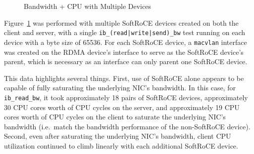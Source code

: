 \documentclass[12pt,titlepage]{article}
\begin{document}
\begin{figure}
	\centering
	\caption{Bandwidth + CPU with Multiple Devices}%
	\label{fig:softroce_multi_vdev}
\end{figure}

Figure~\ref{fig:softroce_multi_vdev} was performed with multiple SoftRoCE devices created on both the client and server, with a single \texttt{ib\_(read|write|send)\_bw} test running on each device with a byte size of 65536.
For each SoftRoCE device, a \texttt{macvlan} interface was created on the RDMA device's interface to serve as the SoftRoCE device's parent, which is necessary as an interface can only parent one SoftRoCE device.

This data highlights several things.
First, use of SoftRoCE alone appears to be capable of fully saturating the underlying NIC's bandwidth.
In this case, for \texttt{ib\_read\_bw}, it took approximately 18 pairs of SoftRoCE devices, approximately 30 CPU cores worth of CPU cycles on the server, and approximately 19 CPU cores worth of CPU cycles on the client to saturate the underlying NIC's bandwidth (i.e.\ match the bandwidth performance of the non-SoftRoCE device).
Second, even after saturating the underlying NIC's bandwidth, client CPU utilization continued to climb linearly with each additional SoftRoCE device.
\end{document}
